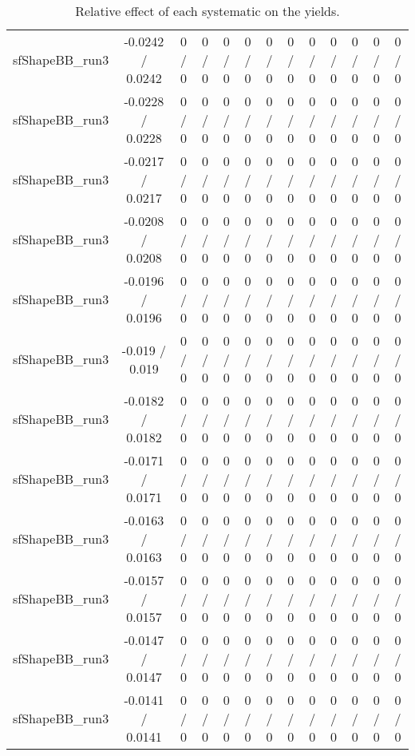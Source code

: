 \documentclass[10pt]{article}
\begin{document}
\begin{table}[htbp]
\begin{center}
\begin{tabular}{|c|c|c|c|c|c|c|c|c|c|c|c|c|}
  sfShapeBB_run3 & -0.0242 / 0.0242 & 0 / 0 & 0 / 0 & 0 / 0 & 0 / 0 & 0 / 0 & 0 / 0 & 0 / 0 & 0 / 0 & 0 / 0 & 0 / 0 & 0 / 0 \\ 
  sfShapeBB_run3 & -0.0228 / 0.0228 & 0 / 0 & 0 / 0 & 0 / 0 & 0 / 0 & 0 / 0 & 0 / 0 & 0 / 0 & 0 / 0 & 0 / 0 & 0 / 0 & 0 / 0 \\ 
  sfShapeBB_run3 & -0.0217 / 0.0217 & 0 / 0 & 0 / 0 & 0 / 0 & 0 / 0 & 0 / 0 & 0 / 0 & 0 / 0 & 0 / 0 & 0 / 0 & 0 / 0 & 0 / 0 \\ 
  sfShapeBB_run3 & -0.0208 / 0.0208 & 0 / 0 & 0 / 0 & 0 / 0 & 0 / 0 & 0 / 0 & 0 / 0 & 0 / 0 & 0 / 0 & 0 / 0 & 0 / 0 & 0 / 0 \\ 
  sfShapeBB_run3 & -0.0196 / 0.0196 & 0 / 0 & 0 / 0 & 0 / 0 & 0 / 0 & 0 / 0 & 0 / 0 & 0 / 0 & 0 / 0 & 0 / 0 & 0 / 0 & 0 / 0 \\ 
  sfShapeBB_run3 & -0.019 / 0.019 & 0 / 0 & 0 / 0 & 0 / 0 & 0 / 0 & 0 / 0 & 0 / 0 & 0 / 0 & 0 / 0 & 0 / 0 & 0 / 0 & 0 / 0 \\ 
  sfShapeBB_run3 & -0.0182 / 0.0182 & 0 / 0 & 0 / 0 & 0 / 0 & 0 / 0 & 0 / 0 & 0 / 0 & 0 / 0 & 0 / 0 & 0 / 0 & 0 / 0 & 0 / 0 \\ 
  sfShapeBB_run3 & -0.0171 / 0.0171 & 0 / 0 & 0 / 0 & 0 / 0 & 0 / 0 & 0 / 0 & 0 / 0 & 0 / 0 & 0 / 0 & 0 / 0 & 0 / 0 & 0 / 0 \\ 
  sfShapeBB_run3 & -0.0163 / 0.0163 & 0 / 0 & 0 / 0 & 0 / 0 & 0 / 0 & 0 / 0 & 0 / 0 & 0 / 0 & 0 / 0 & 0 / 0 & 0 / 0 & 0 / 0 \\ 
  sfShapeBB_run3 & -0.0157 / 0.0157 & 0 / 0 & 0 / 0 & 0 / 0 & 0 / 0 & 0 / 0 & 0 / 0 & 0 / 0 & 0 / 0 & 0 / 0 & 0 / 0 & 0 / 0 \\ 
  sfShapeBB_run3 & -0.0147 / 0.0147 & 0 / 0 & 0 / 0 & 0 / 0 & 0 / 0 & 0 / 0 & 0 / 0 & 0 / 0 & 0 / 0 & 0 / 0 & 0 / 0 & 0 / 0 \\ 
  sfShapeBB_run3 & -0.0141 / 0.0141 & 0 / 0 & 0 / 0 & 0 / 0 & 0 / 0 & 0 / 0 & 0 / 0 & 0 / 0 & 0 / 0 & 0 / 0 & 0 / 0 & 0 / 0 \\ 
\hline 
\end{tabular} 
\caption{Relative effect of each systematic on the yields.} 
\end{center} 
\end{table} 
\end{document}
